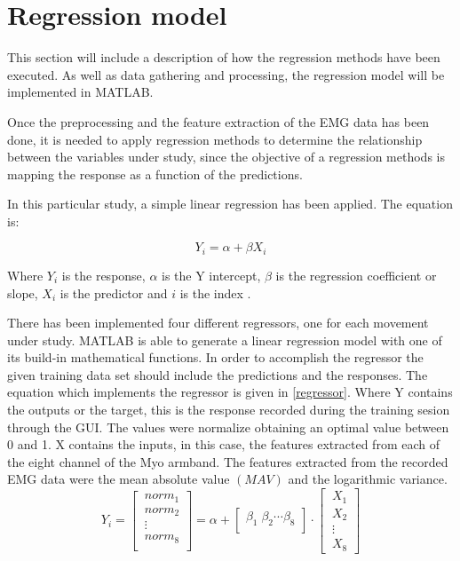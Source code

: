 \section{Regression model}

This section will include a description of how the regression methods have been executed. As well as data gathering and processing, the regression model will be implemented in MATLAB.

Once the preprocessing and the feature extraction of the EMG data has been done, it is needed to apply regression methods to determine the relationship between the variables under study, since the objective of a regression methods is mapping the response  as a function of the predictions.\cite{hahne2014}

In this particular study, a simple linear regression has been applied. The equation is:

\begin{equation}
	Y_i = \alpha + \beta X_i
\end{equation}

Where $Y_i$ is the response, $\alpha$ is the Y intercept, $\beta$ is the regression coefficient or slope, $X_i$ is the predictor and $i$ is the index \cite{zar2009}.

There has been implemented four different regressors, one for each movement under study. MATLAB is able to generate a linear regression model with one of its build-in mathematical functions. In order to accomplish the regressor the given training data set should include the predictions and the responses.
 The equation which implements the regressor is given in \ref{regressor}. Where Y contains the outputs or the target, this is the response recorded during the training sesion through the GUI. The values were normalize obtaining an optimal value between 0 and 1. X contains the inputs, in this case, the features extracted from each of the eight channel of the Myo armband. The features extracted from the recorded EMG data were the mean absolute value $\left( MAV\right)$ and  the logarithmic variance. %
\begin{equation}
	Y_i=\begin{bmatrix} 
	\ norm_1 \\ 
	\ norm_2\\ 
	\ \vdots\\
	\ norm_8\\
	\end{bmatrix}=
	\alpha +
	\begin{bmatrix} 
	\beta_1 \; \beta_2 \cdots \beta_8\\ 
	\end{bmatrix}
	\cdot 
		\begin{bmatrix} 
	\ X_1 \\ 
	\ X_2\\ 
	\ \vdots\\
	\ X_8
	\label{regressor}
	\end{bmatrix}
\end{equation}

